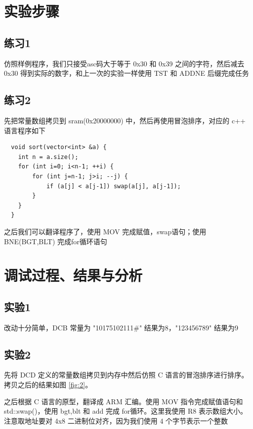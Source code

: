 \documentclass[a4paper,10pt,UTF8]{paper}
\numberwithin{equation}{section}
\numberwithin{figure}{section}
\begin{document}
\section{实验步骤}

\subsection{练习1}

仿照样例程序，我们只接受asc码大于等于 0x30 和 0x39 之间的字符，然后减去 0x30 得到实际的数字，和上一次的实验一样使用 TST 和 ADDNE 后缀完成任务

\subsection{练习2}

先把常量数组拷贝到 sram(0x20000000) 中，然后再使用冒泡排序，对应的 c++ 语言程序如下

\begin{verbatim}
  void sort(vector<int> &a) {
    int n = a.size();
    for (int i=0; i<n-1; ++i) {
        for (int j=n-1; j>i; --j) {
            if (a[j] < a[j-1]) swap(a[j], a[j-1]);
        }
    }
  }
\end{verbatim}

之后我们可以翻译程序了，使用 MOV 完成赋值，swap语句；使用 BNE(BGT,BLT) 完成for循环语句

\section{调试过程、结果与分析}

\subsection{实验1}

改动十分简单，DCB 常量为 "10175102111\#" 结果为8，"123456789" 结果为9

\subsection{实验2}

先将 DCD 定义的常量数组拷贝到内存中然后仿照 C 语言的冒泡排序进行排序。拷贝之后的结果如图 \ref{fig:2}。

之后根据 C 语言的原型，翻译成 ARM 汇编。使用 MOV 指令完成赋值语句和 std::swap()，使用 bgt,blt 和 add 完成 for循环。这里我使用 R8 表示数组大小。注意取地址要对 4x8 二进制位对齐，因为我们使用 4 个字节表示一个整数
\end{document}
